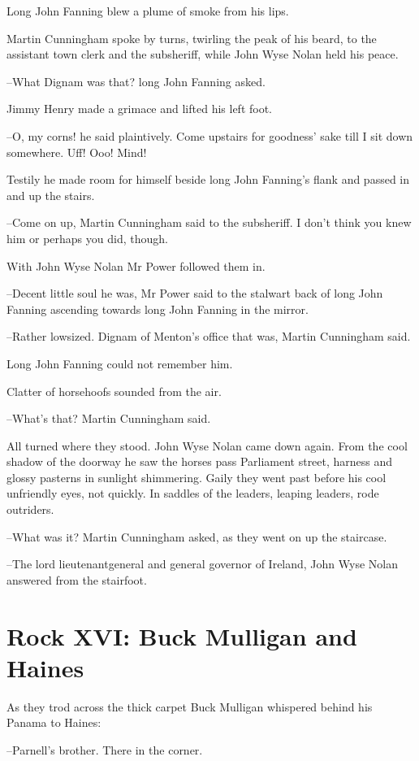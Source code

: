 Long John Fanning blew a plume of smoke from his lips.

Martin Cunningham spoke by turns,
twirling the peak of his beard,
to the
assistant town clerk and the subsheriff,
while John Wyse Nolan held his
peace.

--What Dignam was that?
long John Fanning asked.

Jimmy Henry made a grimace and lifted his left foot.

--O, my corns!
he said plaintively.
Come upstairs for goodness' sake till I sit down somewhere.
Uff!
Ooo!
Mind!

Testily he made room for himself
beside long John Fanning's flank
and
passed in and up the stairs.

--Come on up,
Martin Cunningham said to the subsheriff.
I don't think you
knew him
or perhaps you did, though.

With John Wyse Nolan
Mr Power followed them in.

--Decent little soul he was,
Mr Power said
to the stalwart back of long
John Fanning
ascending towards long John Fanning in the mirror.

--Rather lowsized.
Dignam of Menton's office that was,
Martin Cunningham
said.

Long John Fanning could not remember him.%

Clatter of horsehoofs sounded from the air.

--What's that? Martin Cunningham said.

All turned where they stood.
John Wyse Nolan came down again.
From the
cool shadow of the doorway
he saw the horses pass Parliament street,
harness and glossy pasterns in sunlight shimmering.
Gaily they went past
before his cool unfriendly eyes,
not quickly.
In saddles of the leaders,
leaping leaders,
rode outriders.

--What was it?
Martin Cunningham asked,
as they went on up the staircase.

--The lord lieutenantgeneral and general governor of Ireland,
John Wyse Nolan answered from the stairfoot.


\section*{Rock XVI: Buck Mulligan and Haines}


As they trod across the thick carpet
Buck Mulligan whispered behind
his Panama to Haines:

--Parnell's brother.
There in the corner.

